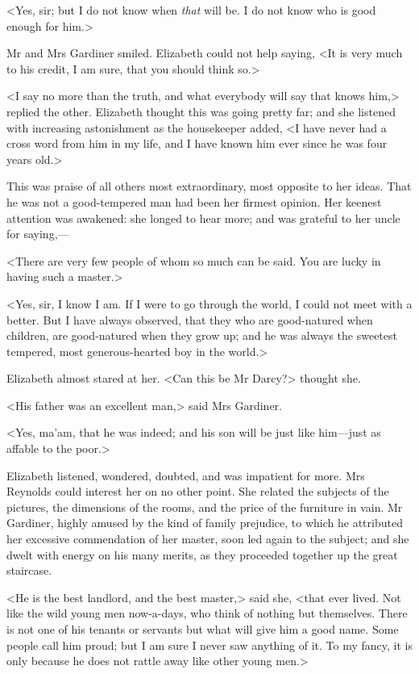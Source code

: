 <Yes, sir; but I do not know when \textit{that} will be. I do not know who is good enough for him.>

Mr and Mrs Gardiner smiled. Elizabeth could not help saying, <It is very much to his credit, I am sure, that you should think so.>

<I say no more than the truth, and what everybody will say that knows him,> replied the other. Elizabeth thought this was going pretty far; and she listened with increasing astonishment as the housekeeper added, <I have never had a cross word from him in my life, and I have known him ever since he was four years old.>

This was praise of all others most extraordinary, most opposite to her ideas. That he was not a good-tempered man had been her firmest opinion. Her keenest attention was awakened: she longed to hear more; and was grateful to her uncle for saying,—

<There are very few people of whom so much can be said. You are lucky in having such a master.>

<Yes, sir, I know I am. If I were to go through the world, I could not meet with a better. But I have always observed, that they who are good-natured when children, are good-natured when they grow up; and he was always the sweetest tempered, most generous-hearted boy in the world.>

Elizabeth almost stared at her. <Can this be Mr Darcy?> thought she.

<His father was an excellent man,> said Mrs Gardiner.

<Yes, ma'am, that he was indeed; and his son will be just like him—just as affable to the poor.>

Elizabeth listened, wondered, doubted, and was impatient for more. Mrs Reynolds could interest her on no other point. She related the subjects of the pictures, the dimensions of the rooms, and the price of the furniture in vain. Mr Gardiner, highly amused by the kind of family prejudice, to which he attributed her excessive commendation of her master, soon led again to the subject; and she dwelt with energy on his many merits, as they proceeded together up the great staircase.

<He is the best landlord, and the best master,> said she, <that ever lived. Not like the wild young men now-a-days, who think of nothing but themselves. There is not one of his tenants or servants but what will give him a good name. Some people call him proud; but I am sure I never saw anything of it. To my fancy, it is only because he does not rattle away like other young men.>

